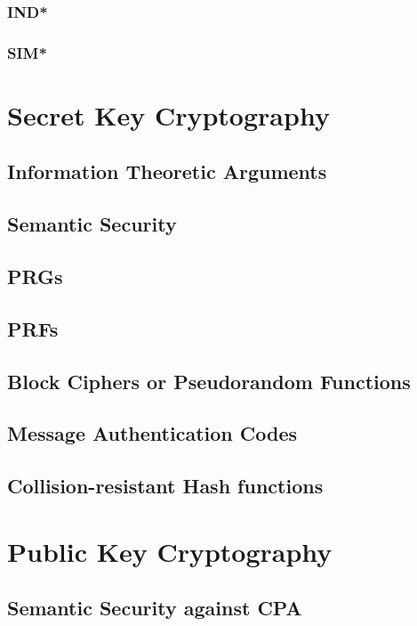 \documentclass[A4, 11pt]{article}
\begin{document}
\subsubsection{IND*}

\subsubsection{SIM*}

\section{Secret Key Cryptography}

\subsection{Information Theoretic Arguments}

\subsection{Semantic Security}

\subsection{PRGs}

\subsection{PRFs}

\subsection{Block Ciphers or Pseudorandom Functions}

\subsection{Message Authentication Codes}

\subsection{Collision-resistant Hash functions}

\section{Public Key Cryptography}

\subsection{Semantic Security against CPA}
\end{document}
